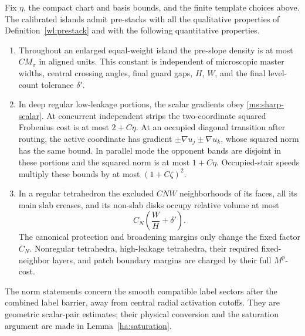 \begin{proposition}
\label{ms:sharp-contract}
Fix $\eta$, the compact chart and basis bounds, and the finite
template choices above.  The calibrated islands admit pre-stacks
with all the qualitative properties of Definition~\ref{wl:prestack} and
with the following quantitative properties.
\begin{enumerate}
\item Throughout an enlarged equal-weight island the pre-slope
density is at most $CM_\sigma$ in aligned units.  This constant
is independent of microscopic master widths, central crossing
angles, final guard gaps, $H$, $W$, and the final level-count
tolerance $\delta'$.
\item In deep regular low-leakage portions, the scalar gradients
obey \eqref{ms:sharp-scalar}.  At concurrent independent strips
the two-coordinate squared Frobenius cost is at most $2+C\eta$.
At an occupied diagonal transition after routing, the active
coordinate has gradient $\pm\nabla u_j\pm\nabla u_k$, whose
squared norm has the same bound.  In parallel mode the opponent
bands are disjoint in these portions and the squared norm is at
most $1+C\eta$.  Occupied-stair speeds multiply these bounds by
at most $(1+C\zeta)^2$.
\item In a regular tetrahedron the excluded $CNW$ neighborhoods
of its faces, all its main slab creases, and its non-slab disks
occupy relative volume at most
\begin{equation}
 C_N\left(\frac WH+\delta'\right).
 \label{ms:dirty-volume}
\end{equation}
The canonical protection and broadening margins only change the
fixed factor $C_N$.  Nonregular tetrahedra, high-leakage
tetrahedra, their required fixed-neighbor layers, and patch
boundary margins are charged by their full $M^p$-cost.
\end{enumerate}
The norm statements concern the smooth compatible label sectors
after the combined label barrier, away from central radial
activation cutoffs.  They are geometric scalar-pair estimates;
their physical conversion and the saturation argument are made
in Lemma~\ref{ha:saturation}.
\end{proposition}

